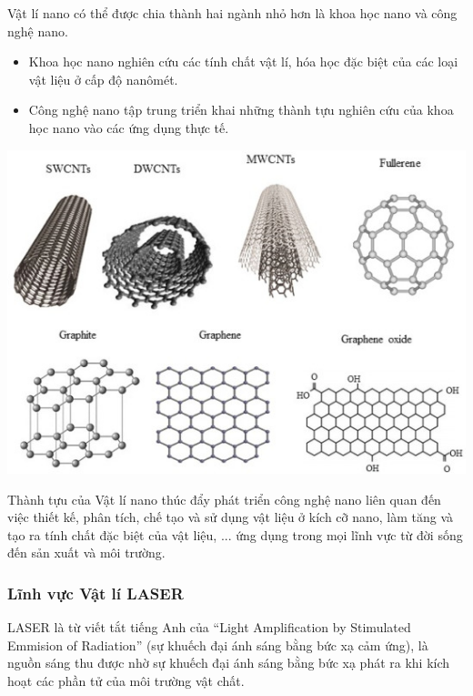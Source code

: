 \begin{minipage}[l]{0.6\textwidth}
Vật lí nano có thể được chia thành hai ngành nhỏ hơn là khoa học nano và công nghệ nano.
\begin{itemize}
	\item Khoa học nano nghiên cứu các tính chất vật lí, hóa học đặc biệt của các loại vật liệu ở cấp độ nanômét.
	\item Công nghệ nano tập trung triển khai những thành tựu nghiên cứu của khoa học nano vào các ứng dụng thực tế.
\end{itemize}
\end{minipage}
\begin{minipage}[r]{0.4\textwidth}
\begin{center}
	\includegraphics[scale=0.4]{../figs/G10-002-6}
\end{center}
\end{minipage}

Thành tựu của Vật lí nano thúc đẩy phát triển công nghệ nano liên quan đến việc thiết kế, phân tích, chế tạo và sử dụng vật liệu ở kích cỡ nano, làm tăng và tạo ra tính chất đặc biệt của vật liệu, ... ứng dụng trong mọi lĩnh vực từ đời sống đến sản xuất và môi trường.
\subsubsection{Lĩnh vực Vật lí LASER}
LASER là từ viết tắt tiếng Anh của ``Light Amplification by Stimulated Emmision of Radiation'' (sự khuếch đại ánh sáng bằng bức xạ cảm ứng), là nguồn sáng thu được nhờ sự khuếch đại ánh sáng bằng bức xạ phát ra khi kích hoạt các phần tử của môi trường vật chất.

